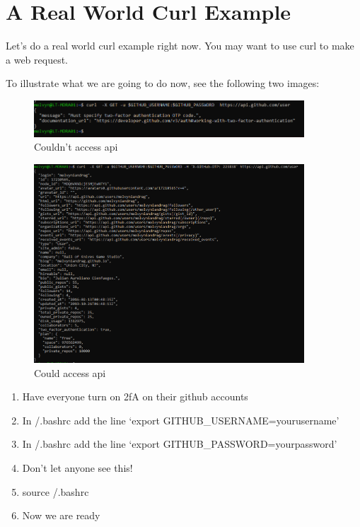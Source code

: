 \documentclass[10pt]{article}
\begin{document}
\section{A Real World Curl Example}
Let's do a real world curl example right now. You may want to use curl to make a web request.

To illustrate what we are going to do now, see the following two images:

\begin{figure}[h]
  \centering
    \includegraphics[width=0.9\textwidth]{unsuccessfulGithubAPIHit.png}
  \caption{Couldn't access api}
\end{figure}

\begin{figure}[h]
  \centering
    \includegraphics[width=0.9\textwidth]{successfulGithubAPIHit.png}
  \caption{Could access api}
\end{figure}


\begin{enumerate}
\item Have everyone turn on 2fA on their github accounts
\item In \texttildelow/.bashrc add the line `export GITHUB\_USERNAME=yourusername'
\item In \texttildelow/.bashrc add the line `export GITHUB\_PASSWORD=yourpassword'
\item Don't let anyone see this!
\item source \texttildelow/.bashrc
\item Now we are ready
\end{enumerate}
\end{document}
